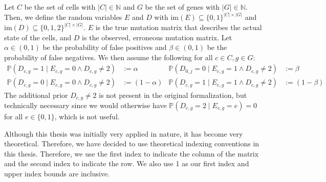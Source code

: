 \begin{definition}
    \label{def:mutmatrix}
    Let $C$ be the set of cells with $|C| \in \mathbb{N}$ and $G$ be the set of genes with $|G| \in \mathbb{N}$. Then, we define the random variables $E$ and $D$ with $\mathrm{im}(E) \subseteq \{0,1\}^{|C| \times |G|}$ and $\mathrm{im}(D) \subseteq \{0, 1, 2\}^{|C| \times |G|}$. $E$ is the true mutation matrix that describes the actual state of the cells, and $D$ is the observed, erroneous mutation matrix. Let $\alpha \in (0,1)$ be the probability of false positives and $\beta \in (0,1)$ be the probability of false negatives. We then assume the following for all $c \in C, g \in G$:
    \begin{align*}
        \mathbb{P}(D_{c,g} = 1 \mid E_{c,g} = 0 \wedge D_{c,g} \neq 2) &:= \alpha & \mathbb{P}(D_{0,j} = 0\mid E_{c,g} = 1 \wedge D_{c,g} \neq 2) &:= \beta \\
        \mathbb{P}(D_{c,g} = 0 \mid E_{c,g} = 0 \wedge D_{c,g} \neq 2) &:= (1-\alpha) & \mathbb{P}(D_{c,g} = 1 \mid E_{c,g} = 1 \wedge D_{c,g} \neq 2) &:= (1-\beta)
    \end{align*}
    The additional prior $D_{c,g} \neq 2$ is not present in the original formalization, but technically necessary since we would otherwise have $\mathbb{P}(D_{c,g} = 2 \mid E_{c,g} = e) = 0$ for all $e \in \{0,1\}$, which is not useful.
    
    Although this thesis was initially very applied in nature, it has become very theoretical. Therefore, we have decided to use theoretical indexing conventions in this thesis. Therefore, we use the first index to indicate the column of the matrix and the second index to indicate the row. We also use 1 as our first index and upper index bounds are inclusive.
\end{definition}

